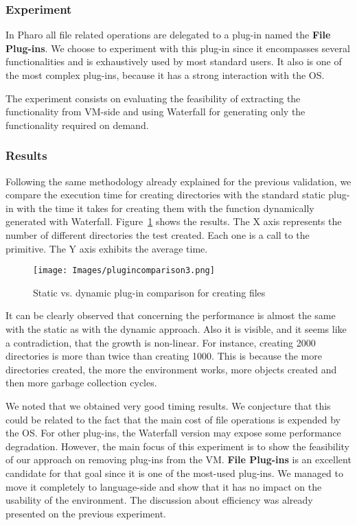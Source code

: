 \documentclass[10pt,preprint,letter]{sigplanconf}
\newcommand{\PH}  {Pharo\xspace}
\newcommand{\W}{Waterfall\xspace}
\begin{document}
\subsubsection{Experiment}
In \PH all file related operations are delegated to a plug-in named the \textbf{File Plug-ins}.
We choose to experiment with this plug-in since it encompasses several functionalities and is exhaustively used by most standard users. It also is one of the most complex plug-ins, because it has a strong interaction with the OS. 

The experiment consists on evaluating the feasibility of extracting the functionality from VM-side and using \W for generating only the functionality required on demand.  



\subsubsection{Results}
Following the same methodology already explained for the previous validation, we compare the execution time for creating directories with the standard static plug-in with the time it takes for creating them with the function dynamically generated with \W.
Figure~\ref{fig:comparisonplugins} shows the results.
The X axis represents the number of different directories the test created. Each one is a call to the primitive.
The Y axis exhibits the average time.

\begin{figure}[t]
\begin{center}
	\texttt{[image: Images/plugincomparison3.png]} 
	\caption{Static vs. dynamic plug-in comparison for creating files}
	\label{fig:comparisonplugins}
\end{center}
\end{figure}

It can be clearly observed that concerning the performance is almost the same with the static as with the dynamic approach. Also it is visible, and it seems like a contradiction, that the growth is non-linear. For instance, creating 2000 directories is more than twice than creating 1000. This is because the more directories created, the more the environment works, more objects created and then more garbage collection cycles. 

We noted that we obtained very good timing results. We conjecture that this could be related to the fact that the main cost of file operations is expended by the OS. For other plug-ins, the \W version may expose some performance degradation. However, the main focus of this experiment is to show the feasibility of our approach on removing plug-ins from the VM. \textbf{File Plug-ins} is an excellent candidate for that goal since it is one of the most-used plug-ins. We managed to move it completely to language-side and show that it has no impact on the usability of the environment. The discussion about efficiency was already presented on the previous experiment.
\end{document}
